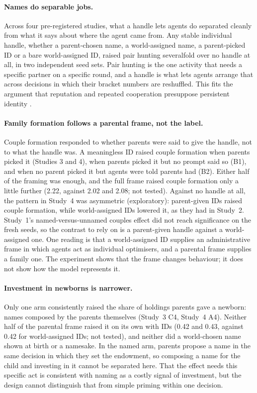 \paragraph{Names do separable jobs.} Across four pre-registered studies, what a handle lets agents
do separated cleanly from what it says about where the agent came from. Any stable individual
handle, whether a parent-chosen name, a world-assigned name, a parent-picked ID or a bare
world-assigned ID, raised pair hunting severalfold over no handle at all, in two independent seed
sets. Pair hunting is the one activity that needs a specific partner on a specific round, and a
handle is what lets agents arrange that across decisions in which their bracket numbers are
reshuffled. This fits the argument that reputation and repeated cooperation presuppose
persistent identity \citep{hu2026dissociative}.

\paragraph{Family formation follows a parental frame, not the label.} Couple formation responded
to whether parents were said to give the handle, not to what the handle was. A meaningless ID
raised couple formation when parents picked it (Studies 3 and 4), when parents picked it but no
prompt said so (B1), and when no parent picked it but agents were told parents had (B2). Either
half of the framing was enough, and the full frame raised couple formation only a little further
(2.22, against 2.02 and 2.08; not tested). Against no handle at all, the
pattern in Study~4 was asymmetric (exploratory): parent-given IDs raised couple formation, while
world-assigned IDs lowered it, as they had in Study~2. Study~1's named-versus-unnamed couples
effect did not reach significance on the fresh seeds, so the contrast to rely on is a
parent-given handle against a world-assigned one. One reading is that a world-assigned ID
supplies an administrative frame in which agents act as individual optimisers, and a parental
frame supplies a family one. The experiment shows that the frame changes behaviour; it does not
show how the model represents it.

\paragraph{Investment in newborns is narrower.} Only one arm consistently raised the share of
holdings parents gave a newborn: names composed by the parents themselves (Study~3 C4, Study~4
A4). Neither half of the parental frame raised it on its own with IDs (0.42 and 0.43, against
0.42 for world-assigned IDs; not tested), and neither did a world-chosen name shown at birth or a
namesake. In the named arm, parents propose a name in the
same decision in which they set the endowment, so composing a name for the child and investing
in it cannot be separated here. That the effect needs this specific act is consistent with
naming as a costly signal of investment, but the design cannot distinguish that from simple
priming within one decision.

